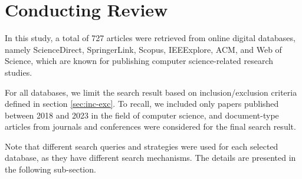 \section{Conducting Review}

In this study, a total of 727 articles were retrieved from online digital databases, namely ScienceDirect, SpringerLink, Scopus, IEEExplore, ACM, and Web of Science, which are known for publishing computer science-related research studies.

For all databases, we limit the search result based on inclusion/exclusion criteria defined in section \ref{sec:inc-exc}. To recall, we included only papers published between 2018 and 2023 in the field of computer science, and document-type articles from journals and conferences were considered for the final search result.

Note that different search queries and strategies were used for each selected database, as they have different search mechanisms. The details are presented in the following sub-section. 












